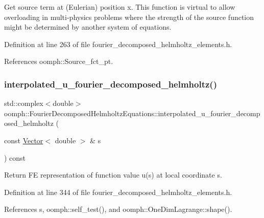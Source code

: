 Get source term at (Eulerian) position x. This function is virtual to allow overloading in multi-\/physics problems where the strength of the source function might be determined by another system of equations. 

Definition at line 263 of file fourier\+\_\+decomposed\+\_\+helmholtz\+\_\+elements.\+h.



References oomph\+::\+Source\+\_\+fct\+\_\+pt.

\mbox{\label{classoomph_1_1FourierDecomposedHelmholtzEquations_ab9fa392f89380cb9244f3630353dcd2a}} 
\subsubsection{\texorpdfstring{interpolated\+\_\+u\+\_\+fourier\+\_\+decomposed\+\_\+helmholtz()}{interpolated\_u\_fourier\_decomposed\_helmholtz()}}
{\footnotesize\ttfamily std\+::complex$<$double$>$ oomph\+::\+Fourier\+Decomposed\+Helmholtz\+Equations\+::interpolated\+\_\+u\+\_\+fourier\+\_\+decomposed\+\_\+helmholtz (\begin{DoxyParamCaption}\item[{const \hyperlink{classoomph_1_1Vector}{Vector}$<$ double $>$ \&}]{s }\end{DoxyParamCaption}) const\hspace{0.3cm}{\ttfamily [inline]}}



Return FE representation of function value u(s) at local coordinate s. 



Definition at line 344 of file fourier\+\_\+decomposed\+\_\+helmholtz\+\_\+elements.\+h.



References s, oomph\+::self\+\_\+test(), and oomph\+::\+One\+Dim\+Lagrange\+::shape().

\mbox{\label{classoomph_1_1FourierDecomposedHelmholtzEquations_a859c683de91b55aef60d1489978598b5}} 

